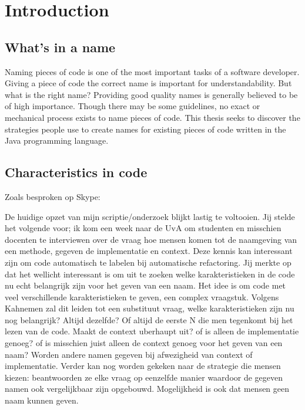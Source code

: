 \section{Introduction}

\subsection{What's in a name}

Naming pieces of code is one of the most important tasks of a software developer. Giving a piece of code the correct name is important for understandability. But what is the right name? Providing good quality names is generally believed to be of high importance. Though there may be some guidelines, no exact or mechanical process exists to name pieces of code. This thesis seeks to discover the strategies people use to create names for existing pieces of code written in the Java programming language.

\subsection{Characteristics in code}




Zoals besproken op Skype:

De huidige opzet van mijn scriptie/onderzoek blijkt lastig te voltooien. Jij stelde het volgende voor; ik kom een week naar de UvA om studenten en misschien docenten te interviewen over de vraag hoe mensen komen tot de naamgeving van een methode, gegeven de implementatie en context. Deze kennis kan interessant zijn om code automatisch te labelen bij automatische refactoring. Jij merkte op dat het wellicht interessant is om uit te zoeken welke karakteristieken in de code nu echt belangrijk zijn voor het geven van een naam. Het idee is om code met veel verschillende karakteristieken te geven, een complex vraagstuk. Volgens Kahnemen zal dit leiden tot een substituut vraag, welke karakteristieken zijn nu nog belangrijk? Altijd dezelfde? Of altijd de eerste N die men tegenkomt bij het lezen van de code. Maakt de context uberhaupt uit? of is alleen de implementatie genoeg? of is misschien juist alleen de context genoeg voor het geven van een naam? Worden andere namen gegeven bij afwezigheid van context of implementatie. Verder kan nog worden gekeken naar de strategie die mensen kiezen: beantwoorden ze elke vraag op eenzelfde manier waardoor de gegeven namen ook vergelijkbaar zijn opgebouwd. Mogelijkheid is ook dat mensen geen naam kunnen geven. 

